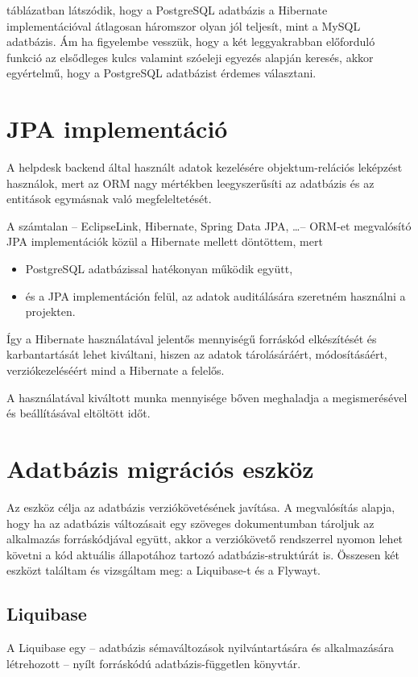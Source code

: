  táblázatban látszódik, hogy a PostgreSQL adatbázis a Hibernate implementációval átlagosan háromszor olyan jól teljesít, mint a MySQL adatbázis. Ám ha figyelembe vesszük, hogy a két leggyakrabban előforduló funkció az elsődleges kulcs valamint szóeleji egyezés alapján keresés, akkor egyértelmű, hogy a PostgreSQL adatbázist érdemes választani.


\section{JPA implementáció}
A helpdesk backend által használt adatok kezelésére objektum-relációs leképzést használok, mert az ORM nagy mértékben leegyszerűsíti az adatbázis és az entitások egymásnak való megfeleltetését.


A számtalan --  EclipseLink, Hibernate, Spring Data JPA, \dots --   ORM-et megvalósító JPA implementációk közül a Hibernate mellett döntöttem, mert
\begin{itemize}
	\item PostgreSQL adatbázissal hatékonyan működik együtt,
	\item és a JPA implementáción felül, az adatok auditálására szeretném használni a projekten.
\end{itemize}

Így a Hibernate használatával jelentős mennyiségű forráskód elkészítését és karbantartását lehet kiváltani, hiszen az adatok tárolásáráért, módosításáért, verziókezeléséért mind a Hibernate a felelős.

A használatával kiváltott munka mennyisége bőven meghaladja a megismerésével és beállításával eltöltött időt.


\section{Adatbázis migrációs eszköz}
Az eszköz célja az adatbázis verziókövetésének javítása. A megvalósítás alapja, hogy ha az adatbázis változásait egy szöveges dokumentumban tároljuk az alkalmazás forráskódjával együtt, akkor a verziókövető rendszerrel nyomon lehet követni a kód aktuális állapotához tartozó adatbázis-struktúrát is. Összesen két eszközt találtam és vizsgáltam meg: a Liquibase-t és a Flywayt.

\subsection{Liquibase}
A Liquibase egy --  adatbázis sémaváltozások nyilvántartására és alkalmazására létrehozott --   nyílt forráskódú adatbázis-független könyvtár.
	
